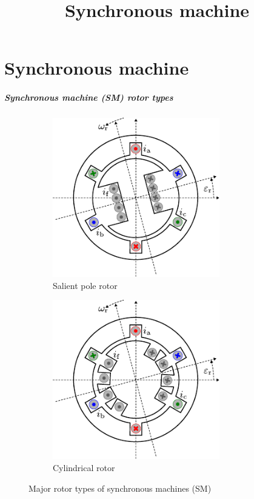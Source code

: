 \part{Synchronous machine}
\title[Synchronous machine]{Synchronous machine}  
\date{}  
\frame{\titlepage} 

\begin{frame}
	\frametitle{Synchronous machine (SM) rotor types}
	\begin{figure}
		\centering
		\begin{subfigure}{0.49\textwidth}
			\centering
			\includegraphics[width=0.8\textwidth]{fig/lec07/SM_salient_pole.pdf}
			\caption{Salient pole rotor}
		\end{subfigure}
		\hfill
		\begin{subfigure}{0.49\textwidth}
			\centering
			\includegraphics[width=0.8\textwidth]{fig/lec07/SM_cylindrical_rotor.pdf}
			\caption{Cylindrical rotor}
		\end{subfigure}
        \caption{Major rotor types of synchronous machines (SM)} 
        \label{fig:examples_SM_rotor}
	\end{figure}
\end{frame}

